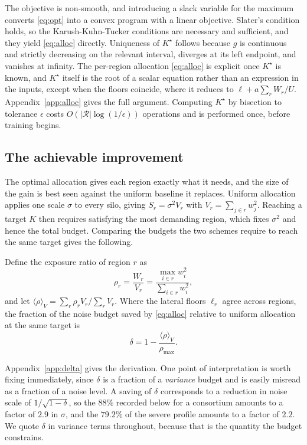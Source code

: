 \documentclass[acmsmall,screen,review,anonymous]{acmart}
\theoremstyle{acmdefinition}%
\newcommand{\Reg}{\mathcal{R}}
\begin{document}
The objective is non-smooth, and introducing a slack variable for the maximum
converts \eqref{eq:opt} into a convex program with a linear objective. Slater's
condition holds, so the Karush-Kuhn-Tucker conditions are necessary and
sufficient, and they yield \eqref{eq:alloc} directly. Uniqueness of $K^{\star}$
follows because $g$ is continuous and strictly decreasing on the relevant interval,
diverges at its left endpoint, and vanishes at infinity. The per-region allocation
\eqref{eq:alloc} is explicit once $K^{\star}$ is known, and $K^{\star}$ itself is
the root of a scalar equation rather than an expression in the inputs, except when
the floors coincide, where it reduces to $\ell + a\sum_r W_r / U$.
Appendix~\ref{app:alloc} gives the full argument. Computing $K^\star$ by bisection
to tolerance $\epsilon$ costs $O(|\Reg| \log(1/\epsilon))$ operations and is
performed once, before training begins.

\subsection{The achievable improvement}

The optimal allocation gives each region exactly what it needs, and the size of
the gain is best seen against the uniform baseline it replaces. Uniform allocation
applies one scale $\sigma$ to every silo, giving $S_r = \sigma^2 V_r$ with $V_r =
\sum_{j \in r} w_j^2$. Reaching a target $K$ then requires satisfying the most
demanding region, which fixes $\sigma^2$ and hence the total budget. Comparing the
budgets the two schemes require to reach the same target gives the following.

\begin{corollary}
\label{cor:delta}
Define the exposure ratio of region $r$ as
\begin{equation}
\rho_r = \frac{W_r}{V_r} = \frac{\max_{i \in r} w_i^2}{\sum_{i \in r} w_i^2},
\end{equation}
and let $\langle \rho \rangle_V = \sum_r \rho_r V_r / \sum_r V_r$. Where the
lateral floors $\ell_r$ agree across regions, the fraction of the noise budget
saved by \eqref{eq:alloc} relative to uniform allocation at the same target is
\begin{equation}
\delta = 1 - \frac{\langle \rho \rangle_V}{\rho_{\max}} .
\label{eq:delta}
\end{equation}
\end{corollary}

Appendix~\ref{app:delta} gives the derivation. One point of interpretation is
worth fixing immediately, since $\delta$ is a fraction of a \emph{variance} budget
and is easily misread as a fraction of a noise level. A saving of $\delta$
corresponds to a reduction in noise scale of $1/\sqrt{1-\delta}$, so the $88\%$
recorded below for a consortium amounts to a factor of $2.9$ in $\sigma$, and the
$79.2\%$ of the severe profile amounts to a factor of $2.2$. We quote $\delta$ in
variance terms throughout, because that is the quantity the budget constrains.
\end{document}
